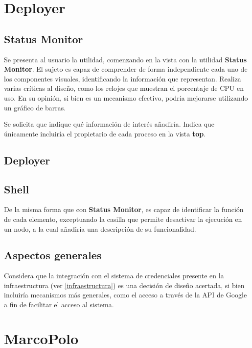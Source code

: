 \section{Deployer}

\subsection{Status Monitor}

Se presenta al usuario la utilidad, comenzando en la vista con la utilidad \textbf{Status Monitor}. El sujeto es capaz de comprender de forma independiente cada uno de los componentes visuales, identificando la información que representan. Realiza varias críticas al diseño, como los relojes que muestran el porcentaje de CPU en uso. En su opinión, si bien es un mecanismo efectivo, podría mejorarse utilizando un gráfico de barras.

Se solicita que indique qué información de interés añadiría. Indica que únicamente incluiría el propietario de cada proceso en la vista \textbf{top}.

\subsection{Deployer}

\subsection{Shell}

De la misma forma que con \textbf{Status Monitor}, es capaz de identificar la función de cada elemento, exceptuando la casilla que permite desactivar la ejecución en un nodo, a la cual añadiría una descripción de su funcionalidad.

\subsection{Aspectos generales}

Considera que la integración con el sistema de credenciales presente en la infraestructura (ver \ref{infraestructura}) es una decisión de diseño acertada, si bien incluiría mecanismos más generales, como el acceso a través de la API de Google a fin de facilitar el acceso al sistema.

\section{MarcoPolo}

